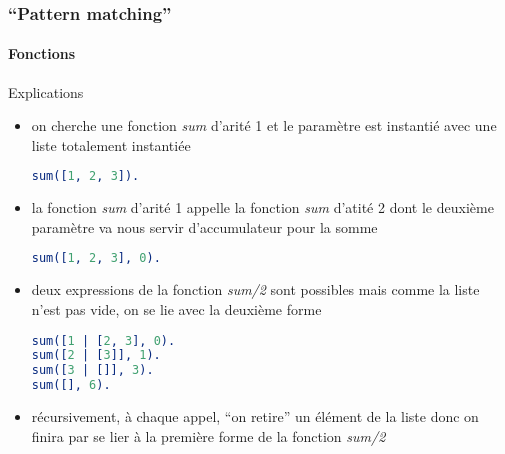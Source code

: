 \begin{frame}[fragile]
  \frametitle{``Pattern matching''}
  \framesubtitle{Fonctions}

  \begin{alertblock}{Explications}
    \begin{itemize}
    \item on cherche une fonction \textit{sum} d'arité 1 et le paramètre est
      instantié avec une liste totalement instantiée
      \begin{lstlisting}[language=erlang]
sum([1, 2, 3]).
      \end{lstlisting}
    \item la fonction \textit{sum} d'arité 1 appelle la fonction \textit{sum}
      d'atité 2 dont le deuxième paramètre va nous servir d'accumulateur pour
      la somme
      \begin{lstlisting}[language=erlang]
sum([1, 2, 3], 0).
      \end{lstlisting}
    \item deux expressions de la fonction \textit{sum/2} sont possibles mais
      comme la liste n'est pas vide, on se lie avec la deuxième forme
      \begin{lstlisting}[language=erlang]
sum([1 | [2, 3], 0).
sum([2 | [3]], 1).
sum([3 | []], 3).
sum([], 6).
      \end{lstlisting}
    \item récursivement, à chaque appel, ``on retire'' un élément de la liste
      donc on finira par se lier à la première forme de la fonction
      \textit{sum/2}
    \end{itemize}
  \end{alertblock}

\end{frame}

